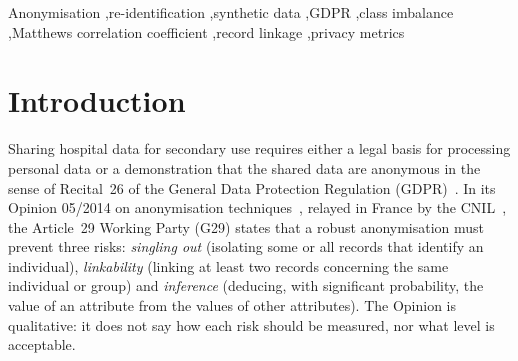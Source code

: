 \documentclass[preprint,12pt]{elsarticle}
\newcommand{\G}{G29}
\begin{document}
\begin{frontmatter}
\begin{abstract}
\textbf{Conclusion.} Risk indicators for synthetic or perturbed health data should be reported as chance-corrected knowledge curves, against a realistic (tolerant) adversary, with imbalance-robust metrics. The proposed set maps one-to-one onto the \G{} criteria and is released as open-source code.
\end{abstract}

\begin{keyword}
Anonymisation \sep re-identification \sep synthetic data \sep GDPR \sep class imbalance \sep Matthews correlation coefficient \sep record linkage \sep privacy metrics
\end{keyword}

\end{frontmatter}

\section{Introduction}
\label{sec:intro}

Sharing hospital data for secondary use requires either a legal basis for processing personal data or a demonstration that the shared data are anonymous in the sense of Recital~26 of the General Data Protection Regulation (GDPR)~\cite{gdpr2016}. In its Opinion 05/2014 on anonymisation techniques~\cite{wp29_2014}, relayed in France by the CNIL~\cite{cnil_g29}, the Article~29 Working Party (\G{}) states that a robust anonymisation must prevent three risks: \emph{singling out} (isolating some or all records that identify an individual), \emph{linkability} (linking at least two records concerning the same individual or group) and \emph{inference} (deducing, with significant probability, the value of an attribute from the values of other attributes). The Opinion is qualitative: it does not say how each risk should be measured, nor what level is acceptable.
\end{document}
